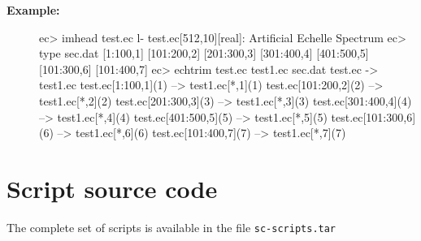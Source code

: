 \documentclass[twoside,11pt]{starlink}
\begin{document}
\begin{description}
\item [\textbf{Example:}] \mbox{} \vspace*{-11pt}
\begin{terminalv}
  ec> imhead test.ec l-
  test.ec[512,10][real]: Artificial Echelle Spectrum
  ec> type sec.dat
  [1:100,1]
  [101:200,2]
  [201:300,3]
  [301:400,4]
  [401:500,5]
  [101:300,6]
  [101:400,7]
  ec> echtrim test.ec test1.ec sec.dat
  test.ec -> test1.ec
  test.ec[1:100,1](1)  -->  test1.ec[*,1](1)
  test.ec[101:200,2](2)  -->  test1.ec[*,2](2)
  test.ec[201:300,3](3)  -->  test1.ec[*,3](3)
  test.ec[301:400,4](4)  -->  test1.ec[*,4](4)
  test.ec[401:500,5](5)  -->  test1.ec[*,5](5)
  test.ec[101:300,6](6)  -->  test1.ec[*,6](6)
  test.ec[101:400,7](7)  -->  test1.ec[*,7](7)
\end{terminalv}
\end{description}

\section{\label{se_sourcecode}Script source code}


The complete set of scripts is available in the file
\texttt{sc\stardocnumber -scripts.tar}





\end{document}
